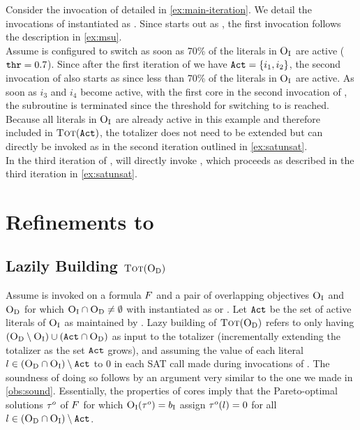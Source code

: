 \begin{example}
  Consider the invocation of \algname{} detailed in \cref{ex:main-iteration}.
  We detail the invocations of \Min{} instantiated as \msh{}.
  Since \msh{} starts out as \msu{}, the first invocation follows the description in \cref{ex:msu}. \\
  Assume \msh{} is configured to switch as soon as 70\% of the literals in $\textsc{O}_{\text{I}}$ are active ($\texttt{thr} = 0.7$).
  Since after the first iteration of \algname{} we have $\texttt{Act} = \{i_1, i_2\}$, the second invocation of \msh{} also starts as \msu{} since less than 70\% of the literals in $\textsc{O}_{\text{I}}$ are active.
  As soon as $i_3$ and $i_4$ become active, with the first core in the second invocation of \msu{}, the \msu{} subroutine is terminated since the threshold for switching to \satunsat{} is reached.
  Because all literals in $\textsc{O}_{\text{I}}$ are already active in this example and therefore included in $\textsc{Tot}(\texttt{Act})$, the totalizer does not need to be extended but \satunsat{} can directly be invoked as in the second iteration outlined in \cref{ex:satunsat}. \\
  In the third iteration of \algname{}, \msh{} will directly invoke \satunsat{}, which proceeds as described in the third iteration in \cref{ex:satunsat}.
\end{example}

\section{Refinements to \algname{}\label{sec:refinements}}

\subsection{Lazily Building $\textsc{Tot}(\textsc{O}_{\text{D}})$}

Assume \algname{} is invoked on a formula $F$ and a pair of overlapping objectives $\textsc{O}_{\text{I}}$ and $\textsc{O}_{\text{D}}$ for which $\textsc{O}_{\text{I}} \cap \textsc{O}_{\text{D}} \neq \emptyset$ with \Min{} instantiated as \msu{} or \oll{}.
Let $\texttt{Act}$ be the set of active literals of $\textsc{O}_{\text{I}}$ as maintained by \Min{}.
Lazy building of $\textsc{Tot}(\textsc{O}_{\text{D}})$ refers to only having $(\textsc{O}_{\text{D}} \setminus \textsc{O}_{\text{I}}) \cup  (\texttt{Act} \cap \textsc{O}_{\text{D}})$ as input to the totalizer (incrementally extending the totalizer as the set $\texttt{Act}$ grows), and assuming the value of each literal $l \in (\textsc{O}_{\text{D}} \cap \textsc{O}_{\text{I}}) \setminus \texttt{Act}$ to $0$ in each SAT call made during invocations of \Simpr{}.
The soundness of doing so follows by an argument very similar to the one we made in \cref{obs:sound}.
Essentially, the properties of cores imply that the Pareto-optimal solutions $\tau^o$ of $F$ for which $\textsc{O}_{\text{I}}(\tau^o) = b_{\text{I}}$ assign $\tau^o(l) = 0$ for all  $l \in (\textsc{O}_{\text{D}} \cap \textsc{O}_{\text{I}}) \setminus \texttt{Act}$. 

